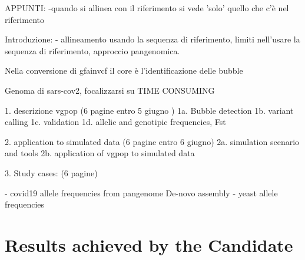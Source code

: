 APPUNTI:
-quando si allinea con il riferimento si vede 'solo' quello che c'è nel riferimento

\vspace{2cm}
Introduzione:
- allineamento usando la sequenza di riferimento, limiti nell'usare la sequenza di riferimento, approccio pangenomica.

Nella conversione di gfainvcf il core è l'identificazione delle bubble

Genoma di sars-cov2, focalizzarsi su TIME CONSUMING   



1. descrizione vgpop (6 pagine entro 5 giugno ) 
1a. Bubble detection
1b. variant calling 
1c. validation 
1d. allelic and genotipic frequencies, Fst 

2. application to simulated data (6 pagine entro 6 giugno) 
2a. simulation scenario and tools 
2b. application of vgpop to simulated data 

3. Study cases: (6 pagine) 


- covid19
allele frequencies from pangenome 
De-novo assembly
- yeast 
allele frequencies


\chapter{Results achieved by the Candidate} %

\label{Chapter5} %







